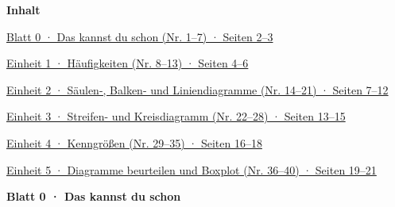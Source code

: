 \documentclass[11pt]{article}
\newcommand{\vz}[2]{\noindent\hyperlink{#1}{#2}\par\smallskip}
\begin{document}
\eng
\noindent\textbf{\large Inhalt}\par\medskip
\vz{b0}{Blatt 0 · Das kannst du schon (Nr. 1--7) · Seiten 2--3}
\vz{e1}{Einheit 1 · Häufigkeiten (Nr. 8--13) · Seiten 4--6}
\vz{e2}{Einheit 2 · Säulen-, Balken- und Liniendiagramme (Nr. 14--21) · Seiten 7--12}
\vz{e3}{Einheit 3 · Streifen- und Kreisdiagramm (Nr. 22--28) · Seiten 13--15}
\vz{e4}{Einheit 4 · Kenngrößen (Nr. 29--35) · Seiten 16--18}
\vz{e5}{Einheit 5 · Diagramme beurteilen und Boxplot (Nr. 36--40) · Seiten 19--21}
\weit
\clearpage\hypertarget{b0}{}\noindent\textbf{Blatt 0 · Das kannst du schon}

\clearpage\hypertarget{e1}{}
\clearpage\hypertarget{e2}{}
\clearpage\hypertarget{e3}{}
\clearpage\hypertarget{e4}{}
\clearpage\hypertarget{e5}{}
\end{document}
